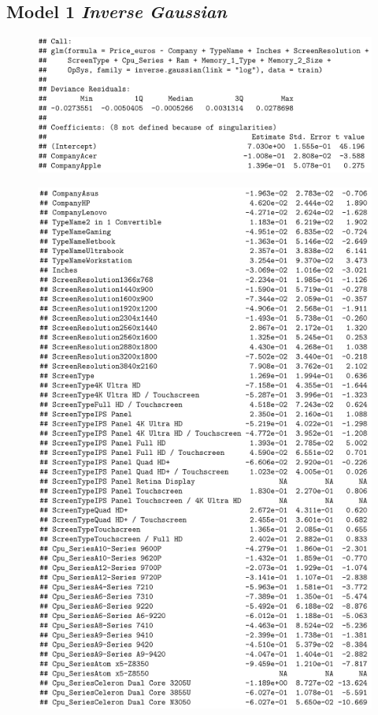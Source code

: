 \documentclass[12pt]{article}
\begin{document}
\subsection{Model 1 \textit{Inverse Gaussian}}
\label{Model_1_Inv}
\begin{figure}[h!]
    \centering
    \includegraphics{Model_2_Sum(1_3).png}
    \label{fig:SUM21}
\end{figure}
\begin{figure}[h!]
    \centering
    \includegraphics{Model_2_Sum(2_3).png}
    \label{fig:SUM22}
\end{figure}
\end{document}
